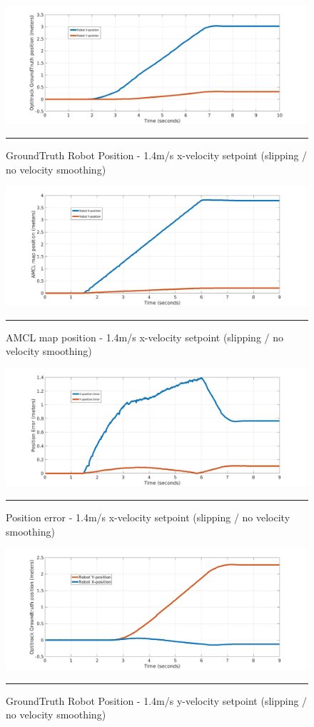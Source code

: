 \begin{figure}[H]
	\centering
	\includegraphics[width=12cm]{images/03-foundation/opti14}
	\rule{35em}{0.5pt}
	\caption{GroundTruth Robot Position - 1.4m/s x-velocity setpoint (slipping / no velocity smoothing)} 
	\label{opti14}
\end{figure}

\begin{figure}[H]
	\centering
	\includegraphics[width=12cm]{images/03-foundation/amcl14}
	\rule{35em}{0.5pt}
	\caption{AMCL map position - 1.4m/s x-velocity setpoint (slipping / no velocity smoothing)} 
	\label{amcl14}
\end{figure}

\begin{figure}[H]
	\centering
	\includegraphics[width=12cm]{images/03-foundation/poserror14}
	\rule{35em}{0.5pt}
	\caption{Position error - 1.4m/s x-velocity setpoint (slipping / no velocity smoothing)} 
	\label{poserror14}
\end{figure}

\begin{figure}[H]
	\centering
	\includegraphics[width=12cm]{images/03-foundation/opti14y}
	\rule{35em}{0.5pt}
	\caption{GroundTruth Robot Position - 1.4m/s y-velocity setpoint (slipping / no velocity smoothing)} 
	\label{opti14y}
\end{figure}

